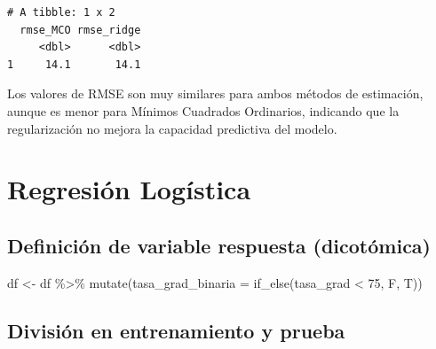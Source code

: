\documentclass[
  letterpaper,
  DIV=11,
  numbers=noendperiod]{scrartcl}
\newenvironment{Shaded}{\begin{snugshade}}{\end{snugshade}}
\newcommand{\AttributeTok}[1]{\textcolor[rgb]{0.40,0.45,0.13}{#1}}
\newcommand{\DecValTok}[1]{\textcolor[rgb]{0.68,0.00,0.00}{#1}}
\newcommand{\FloatTok}[1]{\textcolor[rgb]{0.68,0.00,0.00}{#1}}
\newcommand{\FunctionTok}[1]{\textcolor[rgb]{0.28,0.35,0.67}{#1}}
\newcommand{\NormalTok}[1]{\textcolor[rgb]{0.00,0.23,0.31}{#1}}
\newcommand{\OtherTok}[1]{\textcolor[rgb]{0.00,0.23,0.31}{#1}}
\newcommand{\SpecialCharTok}[1]{\textcolor[rgb]{0.37,0.37,0.37}{#1}}
\begin{document}
\begin{verbatim}
# A tibble: 1 x 2
  rmse_MCO rmse_ridge
     <dbl>      <dbl>
1     14.1       14.1
\end{verbatim}

Los valores de RMSE son muy similares para ambos métodos de estimación,
aunque es menor para Mínimos Cuadrados Ordinarios, indicando que la
regularización no mejora la capacidad predictiva del modelo.

\hypertarget{regresiuxf3n-loguxedstica}{%
\section{Regresión Logística}\label{regresiuxf3n-loguxedstica}}

\hypertarget{definiciuxf3n-de-variable-respuesta-dicotuxf3mica}{%
\subsection{Definición de variable respuesta
(dicotómica)}\label{definiciuxf3n-de-variable-respuesta-dicotuxf3mica}}

\begin{Shaded}
\begin{Highlighting}[]
\NormalTok{df }\OtherTok{\textless{}{-}}\NormalTok{ df }\SpecialCharTok{\%\textgreater{}\%} \FunctionTok{mutate}\NormalTok{(}\AttributeTok{tasa\_grad\_binaria =} \FunctionTok{if\_else}\NormalTok{(tasa\_grad }\SpecialCharTok{\textless{}} \DecValTok{75}\NormalTok{, F, T))}
\end{Highlighting}
\end{Shaded}

\hypertarget{divisiuxf3n-en-entrenamiento-y-prueba-1}{%
\subsection{División en entrenamiento y
prueba}\label{divisiuxf3n-en-entrenamiento-y-prueba-1}}

\begin{Shaded}
\end{Shaded}
\end{document}
